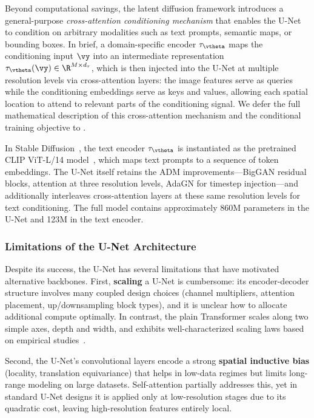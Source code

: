 \documentclass[../../book-main.tex]{subfiles}
\begin{document}
Beyond computational savings, the latent diffusion framework introduces a general-purpose \textit{cross-attention conditioning mechanism} that enables the U-Net to condition on arbitrary modalities such as text prompts, semantic maps, or bounding boxes.
In brief, a domain-specific encoder \(\tau_{\vtheta}\) maps the conditioning input \(\vy\) into an intermediate representation \(\tau_{\vtheta}(\vy) \in \R^{M \times d_{\tau}}\), which is then injected into the U-Net at multiple resolution levels via cross-attention layers: the image features serve as queries while the conditioning embeddings serve as keys and values, allowing each spatial location to attend to relevant parts of the conditioning signal.
We defer the full mathematical description of this cross-attention mechanism and the conditional training objective to .

In Stable Diffusion~\citep{rombach2022high}, the text encoder \(\tau_{\vtheta}\) is instantiated as the pretrained CLIP ViT-L/14 model~\citep{radford2021learning}, which maps text prompts to a sequence of token embeddings.
The U-Net itself retains the ADM improvements---BigGAN residual blocks, attention at three resolution levels, AdaGN for timestep injection---and additionally interleaves cross-attention layers at these same resolution levels for text conditioning.
The full model contains approximately 860M parameters in the U-Net and 123M in the text encoder.

\subsubsection{Limitations of the U-Net Architecture}
\label{sec:unet-limitations}

Despite its success, the U-Net has several limitations that have motivated alternative backbones.
First, \textbf{scaling} a U-Net is cumbersome: its encoder-decoder structure involves many coupled design choices (channel multipliers, attention placement, up/downsampling block types), and it is unclear how to allocate additional compute optimally.
In contrast, the plain Transformer scales along two simple axes, depth and width, and exhibits well-characterized scaling laws based on empirical studies~\citep{kaplan2020scaling}.

Second, the U-Net's convolutional layers encode a strong \textbf{spatial inductive bias} (locality, translation equivariance) that helps in low-data regimes but limits long-range modeling on large datasets.
Self-attention partially addresses this, yet in standard U-Net designs it is applied only at low-resolution stages due to its quadratic cost, leaving high-resolution features entirely local.
\end{document}
